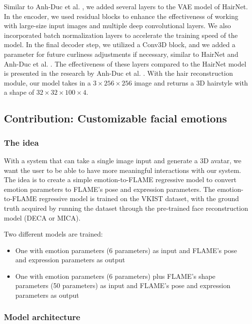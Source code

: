 Similar to Anh-Duc et al. \cite{loThreeDimensionalHairStructure2023}, we added several layers to the VAE model of HairNet. In the encoder, we used residual blocks to enhance the effectiveness of working with large-size input images and multiple deep convolutional layers. We also incorporated batch normalization layers to accelerate the training speed of the model. In the final decoder step, we utilized a Conv3D block, and we added a parameter for future curliness adjustments if necessary, similar to HairNet and Anh-Duc et al. \cite{loThreeDimensionalHairStructure2023}. The effectiveness of these layers compared to the HairNet model is presented in the research by Anh-Duc et al. \cite{loThreeDimensionalHairStructure2023}. With the hair reconstruction module, our model takes in a $3 \times 256 \times 256$ image and returns a 3D hairstyle with a shape of $32 \times 32 \times 100 \times 4$.

\subsection{Contribution: Customizable facial emotions}

\subsubsection{The idea}

With a system that can take a single image input and generate a 3D avatar, we want the user to be able to have more meaningful interactions with our system. The idea is to create a simple emotion-to-FLAME regressive model to convert emotion parameters to FLAME's pose and expression parameters. The emotion-to-FLAME regressive model is trained on the VKIST dataset, with the ground truth acquired by running the dataset through the pre-trained face reconstruction model (DECA or MICA).

Two different models are trained:
\begin{itemize}
    \item One with emotion parameters (6 parameters) as input and FLAME's pose and expression parameters as output
    \item One with emotion parameters (6 parameters) plus FLAME's shape parameters (50 parameters) as input and FLAME's pose and expression parameters as output
\end{itemize}


\subsubsection{Model architecture}

